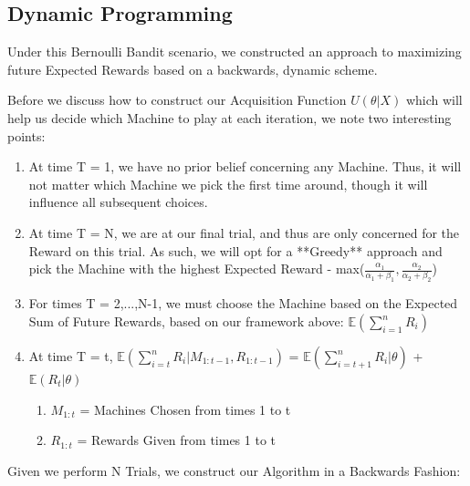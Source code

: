 \documentclass{article}
\begin{document}
\subsection{Dynamic Programming}

Under this Bernoulli Bandit scenario, we constructed an approach to maximizing future Expected Rewards based on a backwards, dynamic scheme.

Before we discuss how to construct our Acquisition Function $U(\theta|X)$ which will help us decide which Machine to play at each iteration, we note two interesting points:\\

\begin{enumerate}
\item At time T = 1, we have no prior belief concerning any Machine. Thus, it will not matter which Machine we pick the first time around, though it will influence all subsequent choices.
\item At time T = N, we are at our final trial, and thus are only concerned for the Reward on this trial. As such, we will opt for a **Greedy** approach and pick the Machine with the highest Expected Reward - max($\frac{\alpha_1}{\alpha_1 + \beta_1}, \frac{\alpha_2}{\alpha_2 + \beta_2}$)
\item For times T = 2,...,N-1, we must choose the Machine based on the Expected Sum of Future Rewards, based on our framework above: $\mathbb{E}(\displaystyle\sum_{i=1}^{n} R_i)$\\
\item At time T = t, $\mathbb{E}(\displaystyle\sum_{i=t}^{n} R_i|M_{1:t-1}, R_{1:t-1})$ = $\mathbb{E}(\displaystyle\sum_{i=t+1}^{n} R_i|\theta)$ + $\mathbb{E}(R_t|\theta)$ 
	\begin{enumerate}
	\item $M_{1:t}$ = Machines Chosen from times 1 to t 
	\item $R_{1:t}$ = Rewards Given from times 1 to t
	\end{enumerate}
\end{enumerate}

Given we perform N Trials, we construct our Algorithm in a Backwards Fashion:\\
\end{document}

